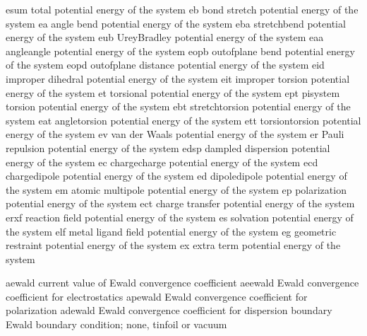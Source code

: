 \documentclass[letterpaper,11pt,english]{sphinxmanual}
\begin{document}
\sphinxAtStartPar
{}

\begin{sphinxVerbatim}[commandchars=\\\{\}]
esum            total potential energy of the system
eb              bond stretch potential energy of the system
ea              angle bend potential energy of the system
eba             stretch\PYGZhy{}bend potential energy of the system
eub             Urey\PYGZhy{}Bradley potential energy of the system
eaa             angle\PYGZhy{}angle potential energy of the system
eopb            out\PYGZhy{}of\PYGZhy{}plane bend potential energy of the system
eopd            out\PYGZhy{}of\PYGZhy{}plane distance potential energy of the system
eid             improper dihedral potential energy of the system
eit             improper torsion potential energy of the system
et              torsional potential energy of the system
ept             pi\PYGZhy{}system torsion potential energy of the system
ebt             stretch\PYGZhy{}torsion potential energy of the system
eat             angle\PYGZhy{}torsion potential energy of the system
ett             torsion\PYGZhy{}torsion potential energy of the system
ev              van der Waals potential energy of the system
er              Pauli repulsion potential energy of the system
edsp            dampled dispersion potential energy of the system
ec              charge\PYGZhy{}charge potential energy of the system
ecd             charge\PYGZhy{}dipole potential energy of the system
ed              dipole\PYGZhy{}dipole potential energy of the system
em              atomic multipole potential energy of the system
ep              polarization potential energy of the system
ect             charge transfer potential energy of the system
erxf            reaction field potential energy of the system
es              solvation potential energy of the system
elf             metal ligand field potential energy of the system
eg              geometric restraint potential energy of the system
ex              extra term potential energy of the system
\end{sphinxVerbatim}

\sphinxAtStartPar
{}

\begin{sphinxVerbatim}[commandchars=\\\{\}]
aewald          current value of Ewald convergence coefficient
aeewald         Ewald convergence coefficient for electrostatics
apewald         Ewald convergence coefficient for polarization
adewald         Ewald convergence coefficient for dispersion
boundary        Ewald boundary condition; none, tinfoil or vacuum
\end{sphinxVerbatim}
\end{document}
